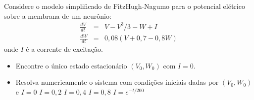 \begin{exer} Considere o modelo simplificado de FitzHugh-Nagumo para o potencial elétrico sobre a membrana de um neurônio:
\begin{eqnarray*}
\frac{d V}{dt}& = &  V-V^3/3 - W +  I  \\
\frac{d W}{dt} & = & 0,08(V+0,7 - 0,8W)
\end{eqnarray*}
onde $I$ é a corrente de excitação.
\begin{itemize}
\item Encontre o único estado estacionário $\left(V_0,W_0\right)$ com $I=0$.
\item Resolva numericamente o sistema com condições iniciais dadas por $\left(V_0,W_0\right)$ e
\subitem $I=0$
\subitem $I=0,2$
\subitem $I=0,4$
\subitem $I=0,8$
\subitem $I=e^{-t/200}$
\end{itemize}
\end{exer}


